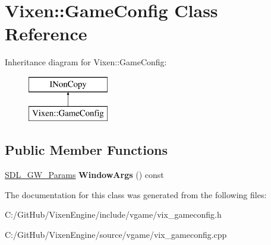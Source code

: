 \hypertarget{class_vixen_1_1_game_config}{}\section{Vixen\+:\+:Game\+Config Class Reference}
\label{class_vixen_1_1_game_config}
Inheritance diagram for Vixen\+:\+:Game\+Config\+:\begin{figure}[H]
\begin{center}
\leavevmode
\includegraphics[height=2.000000cm]{class_vixen_1_1_game_config}
\end{center}
\end{figure}
\subsection*{Public Member Functions}
\begin{DoxyCompactItemize}
\item 
\hypertarget{class_vixen_1_1_game_config_ab4e56e0040069d574b504912034282da}{}\hyperlink{struct_vixen_1_1_s_d_l___g_w___params}{S\+D\+L\+\_\+\+G\+W\+\_\+\+Params} {\bfseries Window\+Args} () const \label{class_vixen_1_1_game_config_ab4e56e0040069d574b504912034282da}

\end{DoxyCompactItemize}


The documentation for this class was generated from the following files\+:\begin{DoxyCompactItemize}
\item 
C\+:/\+Git\+Hub/\+Vixen\+Engine/include/vgame/vix\+\_\+gameconfig.\+h\item 
C\+:/\+Git\+Hub/\+Vixen\+Engine/source/vgame/vix\+\_\+gameconfig.\+cpp\end{DoxyCompactItemize}
